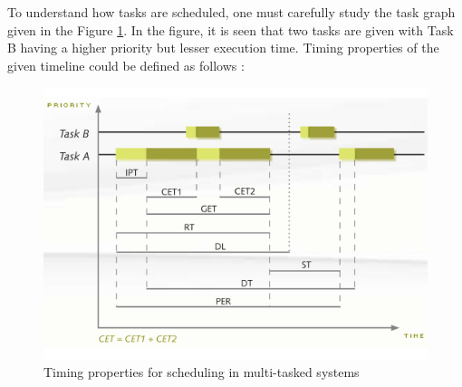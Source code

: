 To understand how tasks are scheduled, one must carefully study the task graph given in the Figure \ref{fig:scheduling}. In the figure, it is seen that two tasks are given with Task B having a higher priority but lesser execution time. Timing properties of the given timeline could be defined as follows \cite{timingposter} \cite{lukas1}:
\begin{figure}[!ht]
	\centering
	\captionsetup{justification=centering}
	\includegraphics[width=\textwidth]{content/images/scheduling.pdf}
	\caption{Timing properties for scheduling in multi-tasked systems \cite{timingposter}}
	\label{fig:scheduling}
\end{figure}
